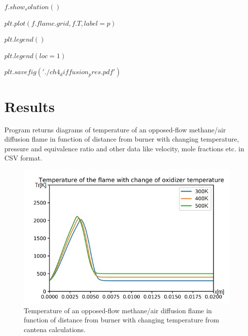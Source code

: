 \documentclass[a4paper]{article}
\begin{document}
\hspace{5,35mm}$    f.show_solution()$

\hspace{5,35mm}$    plt.plot(f.flame.grid, f.T, label=p)$

\hspace{5,35mm}$    plt.legend()$

\hspace{5,35mm}$    plt.legend(loc=1)$

$plt.savefig('./ch4_diffusion_pres.pdf')$


\section{Results}
Program returns diagrams of temperature of an opposed-flow methane/air diffusion flame in function of distance from burner with changing temperature, pressure and equivalence ratio and other data like velocity, mole fractions etc. in CSV format.
\begin{figure}[h!]
\includegraphics[width=1\textwidth]{1.jpg}
\caption{\label{fig:1}Temperature of an opposed-flow methane/air diffusion flame in function of distance from burner with changing temperature from cantena calculations.}
\end{figure}
\end{document}
